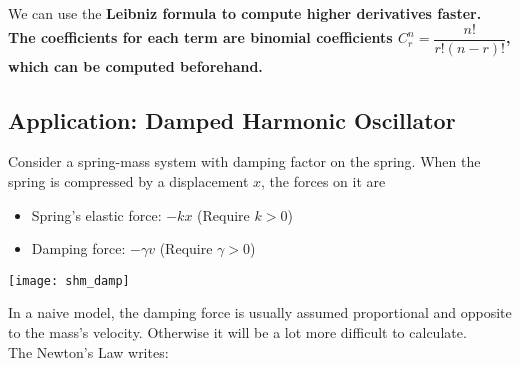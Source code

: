 \documentclass[class=article, crop=false, 12pt]{standalone}
\begin{document}
\begin{notation}
    We can use the \bf{Leibniz formula} to compute higher derivatives faster.
    The coefficients for each term are binomial coefficients $C_r^n = \dfrac{n!}{r!(n-r)!}$, 
    which can be computed beforehand.
\end{notation}




\newpage
\subsection{Application: Damped Harmonic Oscillator}

Consider a spring-mass system with damping factor on the spring.
When the spring is compressed by a displacement $x$, the forces on it are

\begin{minipage}{0.7\textwidth}
    \begin{itemize}
        \item Spring's elastic force: $-kx$ (Require $k>0$)
        \item Damping force: $-\gamma v$ (Require $\gamma >0$)
    \end{itemize}
\end{minipage}
\begin{minipage}{0.28\textwidth}
    \texttt{[image: shm\_damp]}
\end{minipage}


In a naive model, the damping force is usually assumed proportional and opposite to the mass's velocity.
Otherwise it will be a lot more difficult to calculate.\\

The Newton's  Law writes:
\end{document}
